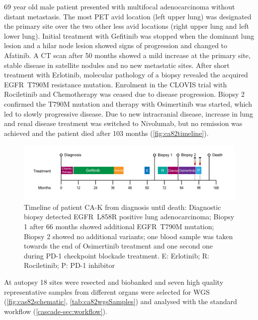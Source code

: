 69 year old male patient presented with multifocal adenocarcinoma without distant metastasis. The most PET avid location (left upper lung) was designated the primary site over the two other less avid locations (right upper lung and left lower lung). Initial treatment with Gefitinib was stopped when the dominant lung lesion and a hilar node lesion showed signs of progression and changed to Afatinib. A CT scan after 50 months showed a mild increase at the primary site, stable disease in satellite nodules and no new metastatic sites. After short treatment with Erlotinib, molecular pathology of a biopsy revealed the acquired EGFR~T790M resistance mutation. Enrolment in the CLOVIS trial with Rociletinib and Chemotherapy was ceased due to disease progression. Biopsy 2 confirmed the T790M mutation and therapy with Osimertinib was started, which led to slowly progressive disease. Due to new intracranial disease, increase in lung and renal disease treatment was switched to Nivolumab, but no remission was achieved and the patient died after 103 months (\autoref{fig:ca82timeline}).



\begin{figure}[ht]
\centering
\includegraphics[width=.99\linewidth]{Figures/CASCADE/CA82/CA-K_timeline}
\caption[Timeline of patient CA-K from diagnosis until death]{Timeline of patient CA-K from diagnosis until death: Diagnostic biopsy detected EGFR~L858R positive lung adenocarcinoma;  Biopsy 1 after 66 months showed additional EGFR~T790M mutation; Biopsy 2 showed no additional variants; one blood sample was taken towards the end of Osimertinib treatment and one second one during PD-1 checkpoint blockade treatment. E: Erlotinib; R: Rociletinib; P: PD-1 inhibitor} \label{fig:ca82timeline}
\end{figure}


At autopsy 18 sites were resected and biobanked and seven high quality representative samples from different organs were selected for WGS (\autoref{fig:cas82schematic}, \autoref{tab:ca82wgsSamples}) and analysed with the standard workflow (\autoref{cascade-sec:workflow}). 




